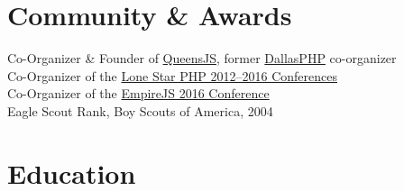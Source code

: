 \documentclass{resume}
\begin{document}
\section{Community \& Awards}

Co-Organizer \& Founder of \href{http://queensjs.com/}{QueensJS}, former \href{http://www.meetup.com/dallasphp/}{DallasPHP} co-organizer
\\
Co-Organizer of the \href{http://lonestarphp.com/}{Lone Star PHP 2012--2016 Conferences}
\\
Co-Organizer of the \href{http://empirejs.org/}{EmpireJS 2016 Conference}
\\
Eagle Scout Rank, Boy Scouts of America, 2004

\section{Education}

\end{document}
